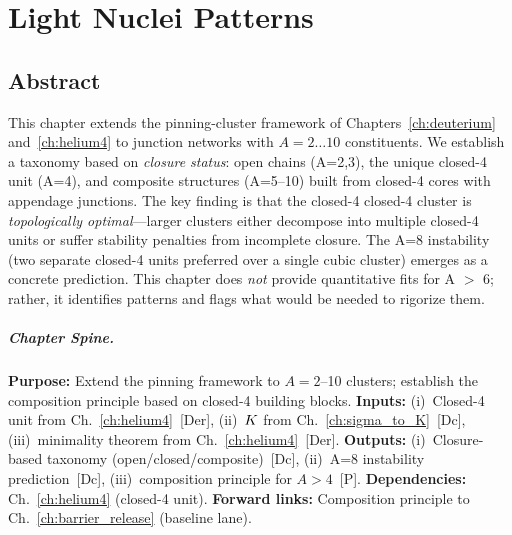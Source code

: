 
\chapter{Light Nuclei Patterns}
\label{ch:light_clusters}


\section*{Abstract}

This chapter extends the pinning-cluster framework of Chapters~\ref{ch:deuterium}
and~\ref{ch:helium4} to junction networks with $A = 2 \ldots 10$ constituents.
We establish a taxonomy based on \emph{closure status}: open chains (A=2,3),
the unique closed-4 unit (A=4), and composite structures (A=5--10) built from
closed-4 cores with appendage junctions. The key finding is that the closed-4
closed-4 cluster is \emph{topologically optimal}---larger clusters either decompose
into multiple closed-4 units or suffer stability penalties from incomplete
closure. The A=8 instability (two separate closed-4 units preferred over a
single cubic cluster) emerges as a concrete prediction. This chapter does
\emph{not} provide quantitative fits for A $>$ 6; rather, it identifies
patterns and flags what would be needed to rigorize them.

\paragraph{Chapter Spine.}
\textbf{Purpose:} Extend the pinning framework to $A = 2$--10 clusters; establish
the composition principle based on closed-4 building blocks.
\textbf{Inputs:} (i)~Closed-4 unit from Ch.~\ref{ch:helium4}~[Der],
(ii)~$K$ from Ch.~\ref{ch:sigma_to_K}~[Dc], (iii)~minimality theorem from Ch.~\ref{ch:helium4}~[Der].
\textbf{Outputs:} (i)~Closure-based taxonomy (open/closed/composite)~[Dc],
(ii)~A=8 instability prediction~[Dc], (iii)~composition principle for $A > 4$~[P].
\textbf{Dependencies:} Ch.~\ref{ch:helium4} (closed-4 unit).
\textbf{Forward links:} Composition principle to Ch.~\ref{ch:barrier_release} (baseline lane).

